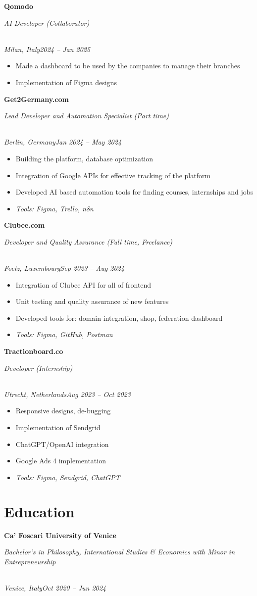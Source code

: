 \documentclass[a4paper,10pt]{article}
\newcommand{\role}[4]{\vspace{3pt}\noindent\hspace{0.6em}\parbox[t]{0.38\textwidth}{\raggedright\textbf{#1}}\hfill\parbox[t]{0.58\textwidth}{\raggedleft\textit{#2}}\\{\textit{#3}\hfill\textit{#4}}\vspace{1pt}}
\begin{document}
\role{Qomodo}{AI Developer (Collaborator)}{Milan, Italy}{2024 -- Jan 2025}
\begin{itemize}
\item Made a dashboard to be used by the companies to manage their branches
\item Implementation of Figma designs
\end{itemize}

\role{Get2Germany.com}{Lead Developer and Automation Specialist (Part time)}{Berlin, Germany}{Jan 2024 -- May 2024}
\begin{itemize}
\item Building the platform, database optimization
\item Integration of Google APIs for effective tracking of the platform
\item Developed AI based automation tools for finding courses, internships and jobs
\item \textit{Tools: Figma, Trello, n8n}
\end{itemize}

\role{Clubee.com}{Developer and Quality Assurance (Full time, Freelance)}{Foetz, Luxembourg}{Sep 2023 -- Aug 2024}
\begin{itemize}
\item Integration of Clubee API for all of frontend
\item Unit testing and quality assurance of new features
\item Developed tools for: domain integration, shop, federation dashboard
\item \textit{Tools: Figma, GitHub, Postman}
\end{itemize}

\role{Tractionboard.co}{Developer (Internship)}{Utrecht, Netherlands}{Aug 2023 -- Oct 2023}
\begin{itemize}
\item Responsive designs, de-bugging
\item Implementation of Sendgrid
\item ChatGPT/OpenAI integration
\item Google Ads 4 implementation
\item \textit{Tools: Figma, Sendgrid, ChatGPT}
\end{itemize}

\section{Education}
\role{Ca' Foscari University of Venice}{Bachelor's in Philosophy, International Studies \& Economics with Minor in Entrepreneurship}{Venice, Italy}{Oct 2020 -- Jun 2024}
\end{document}
